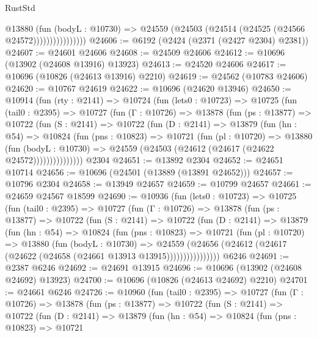 \begin{lexlean}{RustStd}
\begin{coremodule}
                        @13880
                          (fun (bodyL : @10730) =>
                          @24559 (@24503 (@24514 (@24525 (@24566 @24572))))))))))))))))
@24606 := @6192 (@2424 (@2371 (@2427 @2304) @2381))
@24607 := @24601 @24606
@24608 := @24509 @24606
@24612 := @10696 (@13902 (@24608 @13916) @13923)
@24613 := @24520 @24606
@24617 := @10696 (@10826 (@24613 @13916) @2210)
@24619 := @24562 (@10783 @24606)
@24620 := @10767 @24619
@24622 := @10696 (@24620 @13946)
@24650 := @10914
    (fun (rty : @2141) =>
    @10724
      (fun (lets0 : @10723) =>
      @10725
        (fun (tail0 : @2395) =>
        @10727
          (fun (Γ : @10726) =>
          @13878
            (fun (ps : @13877) =>
            @10722
              (fun (S : @2141) =>
              @10722
                (fun (D : @2141) =>
                @13879
                  (fun (hn : @54) =>
                  @10824
                    (fun (pns : @10823) =>
                    @10721
                      (fun (pl : @10720) =>
                      @13880
                        (fun (bodyL : @10730) =>
                        @24559 (@24503 (@24612 (@24617 (@24622 @24572)))))))))))))))
    @2304
@24651 := @13892 @2304
@24652 := @24651 @10714
@24656 := @10696 (@24501 (@13889 (@13891 @24652)))
@24657 := @10796 @2304
@24658 := @13949 @24657
@24659 := @10799 @24657
@24661 := @24659 @24567 @18599
@24690 := @10936
    (fun (lets0 : @10723) =>
    @10725
      (fun (tail0 : @2395) =>
      @10727
        (fun (Γ : @10726) =>
        @13878
          (fun (ps : @13877) =>
          @10722
            (fun (S : @2141) =>
            @10722
              (fun (D : @2141) =>
              @13879
                (fun (hn : @54) =>
                @10824
                  (fun (pns : @10823) =>
                  @10721
                    (fun (pl : @10720) =>
                    @13880
                      (fun (bodyL : @10730) =>
                      @24559
                        (@24656
                          (@24612 (@24617 (@24622 (@24658 (@24661 @13913 @13915))))))))))))))))
    @6246
@24691 := @2387 @6246
@24692 := @24691 @13915
@24696 := @10696 (@13902 (@24608 @24692) @13923)
@24700 := @10696 (@10826 (@24613 @24692) @2210)
@24701 := @24661 @6246
@24726 := @10960
    (fun (tail0 : @2395) =>
    @10727
      (fun (Γ : @10726) =>
      @13878
        (fun (ps : @13877) =>
        @10722
          (fun (S : @2141) =>
          @10722
            (fun (D : @2141) =>
            @13879
              (fun (hn : @54) =>
              @10824
                (fun (pns : @10823) =>
                @10721

\end{coremodule}
\end{lexlean}
